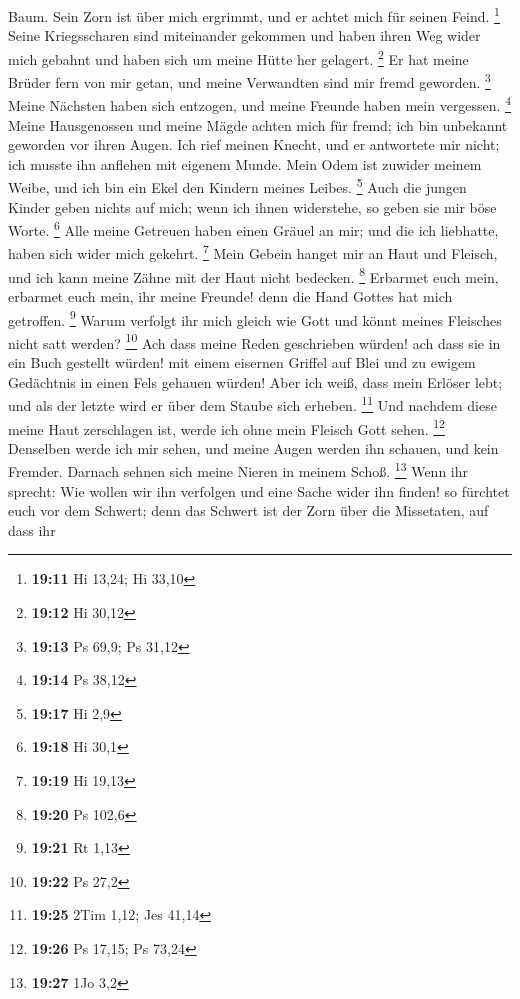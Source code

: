 Baum.  Sein Zorn ist über mich ergrimmt, und er achtet
mich für seinen Feind. \footnote{\textbf{19:11} Hi 13,24; Hi 33,10}
 Seine Kriegsscharen sind miteinander gekommen und haben
ihren Weg wider mich gebahnt und haben sich um meine Hütte her gelagert.
\footnote{\textbf{19:12} Hi 30,12}  Er hat meine Brüder
fern von mir getan, und meine Verwandten sind mir fremd geworden.
\footnote{\textbf{19:13} Ps 69,9; Ps 31,12}  Meine
Nächsten haben sich entzogen, und meine Freunde haben mein vergessen.
\footnote{\textbf{19:14} Ps 38,12}  Meine Hausgenossen
und meine Mägde achten mich für fremd; ich bin unbekannt geworden vor
ihren Augen.  Ich rief meinen Knecht, und er antwortete
mir nicht; ich musste ihn anflehen mit eigenem Munde. 
Mein Odem ist zuwider meinem Weibe, und ich bin ein Ekel den Kindern
meines Leibes. \footnote{\textbf{19:17} Hi 2,9}  Auch die
jungen Kinder geben nichts auf mich; wenn ich ihnen widerstehe, so geben
sie mir böse Worte. \footnote{\textbf{19:18} Hi 30,1} 
Alle meine Getreuen haben einen Gräuel an mir; und die ich liebhatte,
haben sich wider mich gekehrt. \footnote{\textbf{19:19} Hi 19,13}
 Mein Gebein hanget mir an Haut und Fleisch, und ich kann
meine Zähne mit der Haut nicht bedecken. \footnote{\textbf{19:20} Ps
  102,6}  Erbarmet euch mein, erbarmet euch mein, ihr
meine Freunde! denn die Hand Gottes hat mich getroffen. \footnote{\textbf{19:21}
  Rt 1,13}  Warum verfolgt ihr mich gleich wie Gott und
könnt meines Fleisches nicht satt werden? \footnote{\textbf{19:22} Ps
  27,2}  Ach dass meine Reden geschrieben würden! ach
dass sie in ein Buch gestellt würden!  mit einem eisernen
Griffel auf Blei und zu ewigem Gedächtnis in einen Fels gehauen würden!
 Aber ich weiß, dass mein Erlöser lebt; und als der
letzte wird er über dem Staube sich erheben. \footnote{\textbf{19:25}
  2Tim 1,12; Jes 41,14}  Und nachdem diese meine Haut
zerschlagen ist, werde ich ohne mein Fleisch Gott sehen. \footnote{\textbf{19:26}
  Ps 17,15; Ps 73,24}  Denselben werde ich mir sehen, und
meine Augen werden ihn schauen, und kein Fremder. Darnach sehnen sich
meine Nieren in meinem Schoß. \footnote{\textbf{19:27} 1Jo 3,2}
 Wenn ihr sprecht: Wie wollen wir ihn verfolgen und eine
Sache wider ihn finden!  so fürchtet euch vor dem
Schwert; denn das Schwert ist der Zorn über die Missetaten, auf dass ihr
